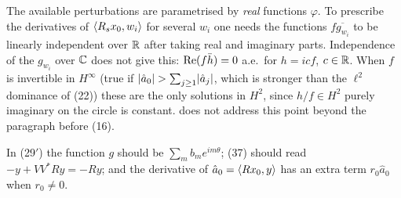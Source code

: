 \begin{remark}\label{rem:real}
The available perturbations are parametrised by \emph{real} functions $\varphi$. To prescribe the
derivatives of $\langle R_sx_0,w_i\rangle$ for several $w_i$ one needs the functions $f\overline{g_{w_i}}$
to be linearly independent over $\mathbb{R}$ after taking real and imaginary parts. Independence of the
$g_{w_i}$ over $\mathbb{C}$ does not give this: $\operatorname{Re}(f\bar h)=0$ a.e.\ for $h=icf$, $c\in\mathbb{R}$. When $f$ is
invertible in $H^\infty$ (true if $\lvert \hat a_0\rvert>\sum_{j\ge1}\lvert \hat a_j\rvert$, which is stronger
than the $\ell^2$ dominance of \paper{} (22)) these are the only solutions in $H^2$, since
$h/f\in H^2$ purely imaginary on the circle is constant. \paper{} does not address this point
beyond the paragraph before (16).
\end{remark}

\begin{remark}
In (29$'$) the function $g$ should be $\sum_mb_me^{im\theta}$; (37) should read
$-y+VV^*Ry=-Ry$; and the derivative of $\hat a_0=\langle Rx_0,y\rangle$ has an extra term $r_0\hat a_0$
when $r_0\ne0$.
\end{remark}
